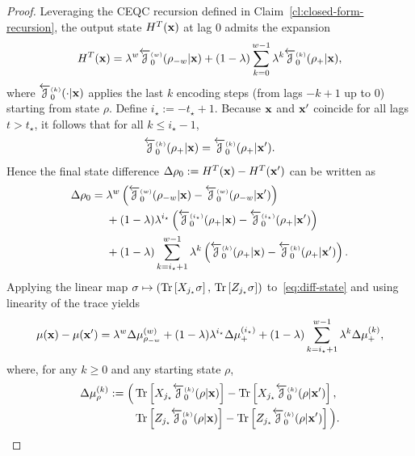 \begin{proof}
    Leveraging the CEQC recursion defined in Claim~\ref{cl:closed-form-recursion}, the output state $H^T({\mathbf{x}})$ at lag $0$ admits the expansion
    \begin{equation*}
        H^T({\mathbf{x}}) = \lambda^w \overleftarrow{{\mathcal{J}}}^{\scriptscriptstyle( w )}_{0}(\rho_{-w}|{\mathbf{x}}) + (1-\lambda) \sum_{k=0}^{w-1} \lambda^k \overleftarrow{{\mathcal{J}}}^{\scriptscriptstyle( k )}_{0}(\rho_+|{\mathbf{x}}),
    \end{equation*}
    where $\overleftarrow{{\mathcal{J}}}^{\scriptscriptstyle( k )}_{0}(\cdot|{\mathbf{x}})$ applies the last $k$ encoding steps (from lags $-k+1$ up to $0$) starting from state $\rho$. Define $i_\star := -t_\star + 1$. Because ${\mathbf{x}}$ and ${\mathbf{x}}'$ coincide for all lags $t > t_\star$, it follows that for all $k \leq i_\star - 1$,
    \begin{equation*}
        \overleftarrow{{\mathcal{J}}}^{\scriptscriptstyle( k )}_{0}(\rho_+|{\mathbf{x}}) = \overleftarrow{{\mathcal{J}}}^{\scriptscriptstyle( k )}_{0}(\rho_+|{\mathbf{x}}').
    \end{equation*}
    Hence the final state difference $\Delta \rho_0 := H^T({\mathbf{x}}) - H^T({\mathbf{x}}')$ can be written as
    \begin{equation}\label{eq:diff-state}
    \begin{aligned}
        \Delta \rho_0 = \; &\lambda^w \left(\overleftarrow{{\mathcal{J}}}^{\scriptscriptstyle( w )}_{0}(\rho_{-w}|{\mathbf{x}}) - \overleftarrow{{\mathcal{J}}}^{\scriptscriptstyle( w )}_{0}(\rho_{-w}|{\mathbf{x}}')\right)\\
        &+ (1-\lambda) \lambda^{i_\star} \left(\overleftarrow{{\mathcal{J}}}^{\scriptscriptstyle( i_\star )}_{0}(\rho_+|{\mathbf{x}}) - \overleftarrow{{\mathcal{J}}}^{\scriptscriptstyle( i_\star )}_{0}(\rho_+|{\mathbf{x}}')\right)\\
        &+ (1-\lambda) \sum_{k=i_\star + 1}^{w-1} \lambda^k \left(\overleftarrow{{\mathcal{J}}}^{\scriptscriptstyle( k )}_{0}(\rho_+|{\mathbf{x}}) - \overleftarrow{{\mathcal{J}}}^{\scriptscriptstyle( k )}_{0}(\rho_+|{\mathbf{x}}')\right).
    \end{aligned}
    \end{equation}
    Applying the linear map $\sigma \mapsto (\operatorname{Tr}\left[X_{j_\star}\sigma\right],\,\operatorname{Tr}\left[Z_{j_\star}\sigma\right])$ to~\cref{eq:diff-state}
    and using linearity of the trace yields
    \begin{equation}\label{eq:delta-mu-decomp}
    \mu({\mathbf{x}})-\mu({\mathbf{x}}')
    =
    \lambda^w \Delta\mu^{(w)}_{\rho_{-w}}
    +
    (1-\lambda)\lambda^{i_\star} \Delta\mu^{(i_\star)}_{+}
    +
    (1-\lambda)\sum_{k=i_\star+1}^{w-1}\lambda^{k} \Delta\mu^{(k)}_{+},
    \end{equation}
    where, for any $k\ge 0$ and any starting state $\rho$,
    \[
    \begin{aligned}
        \Delta\mu^{(k)}_{\rho}
    :=
    \Big(
    &\operatorname{Tr}\left[X_{j_\star} \overleftarrow{{\mathcal{J}}}^{\scriptscriptstyle( k )}_{0}(\rho|{\mathbf{x}})\right] -
    \operatorname{Tr}\left[X_{j_\star} \overleftarrow{{\mathcal{J}}}^{\scriptscriptstyle( k )}_{0}(\rho|{\mathbf{x}}')\right], \\
    &\operatorname{Tr}\left[Z_{j_\star} \overleftarrow{{\mathcal{J}}}^{\scriptscriptstyle( k )}_{0}(\rho|{\mathbf{x}})\right]
    -
    \operatorname{Tr}\left[Z_{j_\star} \overleftarrow{{\mathcal{J}}}^{\scriptscriptstyle( k )}_{0}(\rho|{\mathbf{x}}')\right]
    \Big).
    \end{aligned}
    \]
    

\end{proof}
